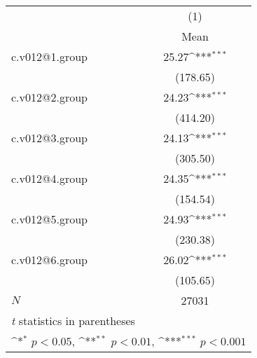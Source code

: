 {
\def\sym#1{\ifmmode^{#1}\else\(^{#1}\)\fi}
\begin{tabular}{l*{1}{c}}
\hline\hline
            &\multicolumn{1}{c}{(1)}\\
            &\multicolumn{1}{c}{Mean}\\
\hline
c.v012@1.group&       25.27\sym{***}\\
            &    (178.65)         \\
[1em]
c.v012@2.group&       24.23\sym{***}\\
            &    (414.20)         \\
[1em]
c.v012@3.group&       24.13\sym{***}\\
            &    (305.50)         \\
[1em]
c.v012@4.group&       24.35\sym{***}\\
            &    (154.54)         \\
[1em]
c.v012@5.group&       24.93\sym{***}\\
            &    (230.38)         \\
[1em]
c.v012@6.group&       26.02\sym{***}\\
            &    (105.65)         \\
\hline
\(N\)       &       27031         \\
\hline\hline
\multicolumn{2}{l}{\footnotesize \textit{t} statistics in parentheses}\\
\multicolumn{2}{l}{\footnotesize \sym{*} \(p<0.05\), \sym{**} \(p<0.01\), \sym{***} \(p<0.001\)}\\
\end{tabular}
}
